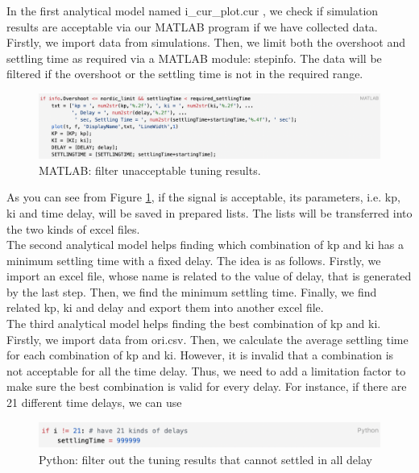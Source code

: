 \documentclass{report}
\begin{document}
In the first analytical model named i\_cur\_plot.cur , we check if simulation results are acceptable via our MATLAB program if we have collected data. Firstly, we import data from simulations. Then, we limit both the overshoot and settling time as required via a MATLAB module: stepinfo. The data will be filtered if the overshoot or the settling time is not in the required range.\\

\begin{figure}[htbp]
\centering
\includegraphics[width = .999\textwidth]{figure/3_4_2_code5.png}
\caption{MATLAB: filter unacceptable tuning results.}
\label{3_4_2_code5}
\end{figure}


As you can see from Figure \textcolor{red}{\ref{3_4_2_code5}}, if the signal is acceptable, its parameters, i.e. kp, ki and time delay, will be saved in prepared lists. The lists will be transferred into the two kinds of excel files.\\

The second analytical model helps finding which combination of kp and ki has a minimum settling time with a fixed delay. The idea is as follows. Firstly, we import an excel file, whose name is related to the value of delay,  that is generated by the last step. Then, we find the minimum settling time. Finally, we find related kp, ki and delay and export them into another excel file.\\

The third analytical model helps finding the best combination of kp and ki. Firstly, we import data from ori.csv. Then, we calculate the average settling time for each combination of kp and ki. However, it is invalid that a combination is not acceptable for all the time delay. Thus, we need to add a limitation factor to make sure the best combination is valid for every delay. For instance, if there are 21 different time delays, we can use\\

\begin{figure}[htbp]
\centering
\includegraphics[width = .999\textwidth]{figure/3_4_2_code6.png}
\caption{Python: filter out the tuning results that cannot settled in all delay}
\label{3_4_2_code6}
\end{figure}
\end{document}
